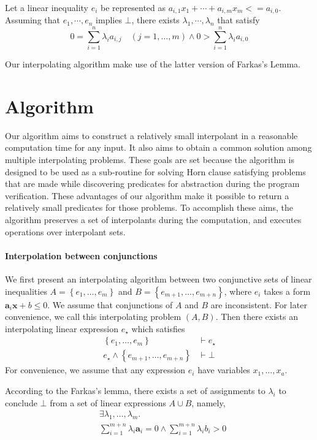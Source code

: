 Let a linear inequality $e_i$ be represented as
$a_{i,1} x_1 + \cdots + a_{i,m} x_m <= a_{i,0}$.  Assuming that
$e_1,\cdots,e_n$ implies $\bot$, there exists
$\lambda_1,\cdots,\lambda_n$ that satisfy
\[0 = \sum_{i=1}^n \lambda_i a_{i,j} \quad (j=1, \ldots, m) \wedge
0 > \sum_{i=1}^n \lambda_i a_{i,0}\]

Our interpolating algorithm make use of the latter version of Farkas's
Lemma.


\section{Algorithm}

Our algorithm aims to construct a relatively small interpolant in a
reasonable computation time for any input.  It also aims to obtain a
common solution among multiple interpolating problems.  These goals
are set because the algorithm is designed to be used as a sub-routine
for solving Horn clause satisfying problems
that are made while discovering predicates for abstraction
during the program verification.  These advantages of our algorithm
make it possible to return a relatively small predicates for those
problems. To accomplish these aims, the algorithm preserves a set of
interpolants during the computation, and executes operations
over interpolant sets.


\paragraph{Interpolation between conjunctions}
We first present an interpolating algorithm between two conjunctive
sets of linear inequalities $A = \left\lbrace e_1,\ldots,e_m
\right\rbrace$ and $B = \left\lbrace e_{m+1},\ldots,e_{m+n}
\right\rbrace$, where $e_i$ takes a form $\mathbf{a}_i \mathbf{x} + b
\leq 0$.  We assume that conjunctions of $A$ and $B$ are inconsistent.
For later convenience, we call this interpolating problem $\left( A, B
\right)$.  Then there exists an interpolating linear expression
$e_\star$ which satisfies
\begin{align*}
\left\lbrace e_1,\ldots,e_m \right\rbrace & \vdash e_\star \\
e_\star \wedge \left\lbrace e_{m+1},\ldots,e_{m+n} \right\rbrace & \vdash \bot
\end{align*}
For convenience, we assume that any expression $e_i$ have variables
$x_1, \ldots, x_a$.

According to the Farkas's lemma, there exists a set of assignments to
$\lambda_i$ to conclude $\bot$ from a set of linear expressions $A
\cup B$, namely,
\begin{align*}
& \exists \lambda_1, \ldots, \lambda_m. \\
& \sum_{i=1}^{m+n} \lambda_i \mathbf{a}_i = 0\wedge \sum_{i=1}^{m+n} \lambda_i b_i > 0
\end{align*}


